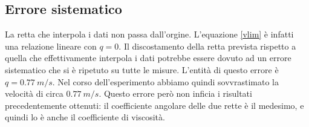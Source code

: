 \subsection*{Errore sistematico}
La retta che interpola i dati non passa dall'orgine. L'equazione \ref{vlim} è infatti una relazione lineare con $q=0$. Il discostamento della retta prevista rispetto a  quella che effettivamente interpola i dati potrebbe essere dovuto ad un errore sistematico che si è ripetuto su tutte le misure. L'entità di questo errore  è $q =0.77 \ m/s$. Nel corso dell'esperimento abbiamo quindi sovvrastimato la velocità di circa $0.77 \ m/s$. Questo errore però non inficia i risultati precedentemente ottenuti: il coefficiente angolare delle due rette è il medesimo, e quindi lo è anche il coefficiente di viscosità. 




